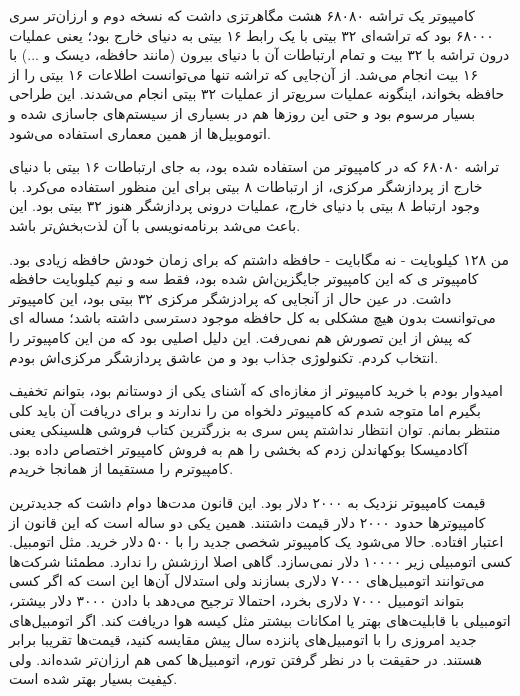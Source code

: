 کامپیوتر یک تراشه ۶۸۰۸۰ هشت مگاهرتزی داشت که نسخه دوم و ارزان‌تر سری
۶۸۰۰۰ بود که تراشه‌ای ۳۲ بیتی با یک رابط ۱۶ بیتی به دنیای خارج بود؛
یعنی عملیات درون تراشه با ۳۲ بیت و تمام ارتباطات آن با دنیای بیرون
(مانند حافظه، دیسک‌ و ...) با ۱۶ بیت انجام می‌شد. از آن‌جایی که تراشه
تنها می‌توانست اطلاعات ۱۶ بیتی را از حافظه بخواند،‌ اینگونه عملیات
سریع‌تر از عملیات ۳۲ بیتی انجام می‌شدند. این طراحی بسیار مرسوم بود و حتی
این روزها هم در بسیاری از سیستم‌های جاسازی شده و اتوموبیل‌ها از
همین معماری استفاده می‌شود.

تراشه ۶۸۰۸۰ که در کامپیوتر من استفاده شده بود، به جای ارتباطات ۱۶ بیتی
با دنیای خارج از پردازشگر مرکزی، از ارتباطات ۸ بیتی برای این منظور
استفاده می‌کرد. با وجود ارتباط ۸ بیتی با دنیای خارج، عملیات درونی
پردازشگر هنوز ۳۲ بیتی بود. این باعث می‌شد برنامه‌نویسی با آن لذت‌بخش‌تر
باشد.

من ۱۲۸ کیلوبایت - نه مگابایت - حافظه داشتم که برای زمان خودش حافظه
زیادی بود. کامپیوتر ی که این کامپیوتر جایگزین‌اش شده بود،
فقط سه و نیم کیلوبایت حافظه داشت. در عین حال از آنجایی که پرادزشگر
مرکزی ۳۲ بیتی بود، این کامپیوتر می‌توانست بدون هیچ مشکلی به کل حافظه
موجود دسترسی داشته باشد؛ مساله ای که پیش از این تصورش هم نمی‌رفت. این
دلیل اصلیی بود که من این کامپیوتر را انتخاب کردم. تکنولوژی جذاب بود و
من عاشق پردازشگر مرکزی‌اش بودم.

امیدوار بودم با خرید کامپیوتر از مغازه‌ای که آشنای یکی از دوستانم بود،‌
بتوانم تخفیف بگیرم اما متوجه شدم که کامپیوتر دلخواه من را ندارند و
برای دریافت آن باید کلی منتظر بمانم. توان انتظار نداشتم پس سری به
بزرگترین کتاب فروشی هلسینکی یعنی آکادمیسکا
بوکهاندلن زدم که بخشی را هم به فروش
کامپیوتر اختصاص داده بود. کامپیوترم را مستقیما از همانجا خریدم.

قیمت کامپیوتر نزدیک به ۲۰۰۰ دلار بود. این قانون مدت‌ها دوام داشت که
جدیدترین کامپیوترها حدود ۲۰۰۰ دلار قیمت داشتند. همین یکی دو ساله است
که این قانون از اعتبار افتاده. حالا می‌شود یک کامپیوتر شخصی جدید را با
۵۰۰ دلار خرید. مثل اتومبیل‌. کسی اتومبیلی زیر ۱۰۰۰۰ دلار نمی‌سازد. گاهی
اصلا ارزشش را ندارد. مطمئنا شرکت‌ها می‌توانند اتومبیل‌های ۷۰۰۰ دلاری
بسازند ولی استدلال آن‌ها این است که اگر کسی بتواند اتومبیل ۷۰۰۰ دلاری
بخرد، احتمالا ترجیح می‌دهد با دادن ۳۰۰۰ دلار بیشتر، اتومبیلی با
قابلیت‌های بهتر یا امکانات بیشتر مثل کیسه هوا دریافت کند. اگر
اتومبیل‌های جدید امروزی را با اتومبیل‌های پانزده سال پیش مقایسه کنید،
قیمت‌ها تقریبا برابر هستند. در حقیقت با در نظر گرفتن تورم، اتومبیل‌ها
کمی هم ارزان‌تر شده‌اند. ولی کیفیت بسیار بهتر شده است.

